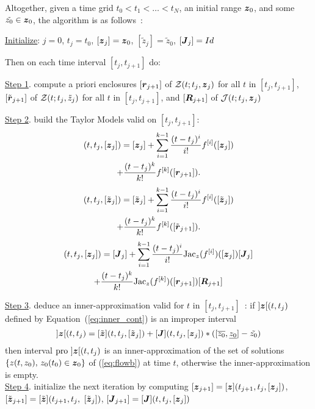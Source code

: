 \documentclass{sig-alternate-05-2015} %
\newcommand{\pro}{\mbox{pro }}
\begin{document}
Altogether, given a time grid  $t_0 < t_1 < \ldots < t_N$, 
an initial range $\z_0$, and some $\tilde{z_0} \in \z_0$, the algorithm is as follows~:
 {\par %
  \begin{center}%
   \fbox%
   {\parbox{1.\linewidth}%
    { %
\underline{Initialize}: $j=0$, $t_j=t_0$, $[\z_j]=\z_0$, $[\tilde{z}_j]=\tilde{z}_0$, $[\J_j] = Id$

Then on each time interval $[t_j,t_{j+1}]$ do:

\underline{Step 1}. compute a priori enclosures $[\r_{j+1}]$  of  ${\cal Z}(t;t_j,\z_j)$ for all $t$ in $[t_j,t_{j+1}]$, $[\tilde{\r}_{j+1}]$  of  ${\cal Z}(t;t_j,\tilde{z}_j)$ for all $t$ in $[t_j,t_{j+1}]$,
and $[\bfm{R}_{j+1}]$ of ${\cal J}(t;t_j,\z_j)$

\underline{Step 2}. build the Taylor Models valid on $[t_j,t_{j+1}]$:
\begin{multline}
[\z](t,t_j,[{\z}_j]) = [{\z}_j] + \sum\limits_{i=1}^{k-1} \frac{(t-t_j)^i}{i !} f^{[i]}([{\z}_j])\\+ 
\frac{(t-t_j)^k}{k !} f^{[k]}([{\r}_{j+1}]).
\label{eq:TM1}
\end{multline}
\begin{multline}
[\tilde{\z}](t,t_j,[\tilde{\z}_j]) = [\tilde{\z}_j] + \sum\limits_{i=1}^{k-1} \frac{(t-t_j)^i}{i !} f^{[i]}([\tilde{\z}_j])\\+ \frac{(t-t_j)^k}{k !} f^{[k]}([\tilde{\r}_{j+1}]).
\label{eq:TM2}
\end{multline}
\begin{multline}
[\J](t,t_j,[{\z}_j]) = [{\J}_j] + \sum\limits_{i=1}^{k-1} \frac{(t-t_j)^i}{i !} \mbox{Jac}_z(f^{[i]})([{\z}_{j}]) [{\J}_j] \\ +  \frac{(t-t_j)^k}{k !} \mbox{Jac}_z(f^{[k]})([{\r}_{j+1}]) [\bfm{R}_{j+1}]
\label{eq:TM3}
\end{multline}

\underline{Step 3}. deduce an inner-approximation valid for $t$ in $[t_j,t_{j+1}]$~: if $]\z[(t,t_j)$ defined by Equation~(\ref{eq:inner_cont}) is an improper interval\\
\begin{equation} 
]\z[(t,t_j) = [\tilde{\z}](t,t_j,[\tilde{\z}_j]) + [\J](t,t_j,[{\z}_j])*([\overline{z_0},\underline{z_0}]-\tilde{z_0}) 
\label{eq:inner_cont}
\end{equation}
\noindent 
then interval $\pro]\z[(t,t_j)$ is an inner-approximation of  the set of solutions $\{ z(t,z_0), \, z_0(t_0) \in \z_0 \}$ of  (\ref{eq:flowb}) at time $t$,
otherwise the inner-approximation is empty.\\

\underline{Step 4}. initialize the next iteration by computing $[{\z}_{j+1}]=[\z](t_{j+1},t_j,[{\z}_j])$, $[\tilde{\z}_{j+1}]=[\tilde{\z}](t_{j+1},t_j,$ $[\tilde{\z}_j])$, $[\J_{j+1}] = [\J](t,t_j,[{\z}_j]) $\\
 }%
   }%
  \end{center}%
  \par\smallskip                     %
 }        
\end{document}
